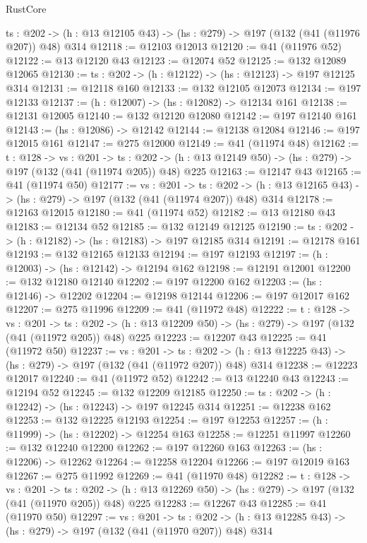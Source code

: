 \begin{lexlean}{RustCore}
\begin{coremodule}
  {ts : @202} -> (h : @13 @12105 @43) -> (hs : @279) -> @197 (@132 (@41 (@11976 @207)) @48) @314
@12118 := @12103 @12013
@12120 := @41 (@11976 @52)
@12122 := @13 @12120 @43
@12123 := @12074 @52
@12125 := @132 @12089 @12065
@12130 := {ts : @202} -> (h : @12122) -> (hs : @12123) -> @197 @12125 @314
@12131 := @12118 @160
@12133 := @132 @12105 @12073
@12134 := @197 @12133
@12137 := (h : @12007) -> (hs : @12082) -> @12134 @161
@12138 := @12131 @12005
@12140 := @132 @12120 @12080
@12142 := @197 @12140 @161
@12143 := (hs : @12086) -> @12142
@12144 := @12138 @12084
@12146 := @197 @12015 @161
@12147 := @275 @12000
@12149 := @41 (@11974 @48)
@12162 := {t : @128} ->
  {vs : @201} ->
  {ts : @202} -> (h : @13 @12149 @50) -> (hs : @279) -> @197 (@132 (@41 (@11974 @205)) @48) @225
@12163 := @12147 @43
@12165 := @41 (@11974 @50)
@12177 := {vs : @201} ->
  {ts : @202} -> (h : @13 @12165 @43) -> (hs : @279) -> @197 (@132 (@41 (@11974 @207)) @48) @314
@12178 := @12163 @12015
@12180 := @41 (@11974 @52)
@12182 := @13 @12180 @43
@12183 := @12134 @52
@12185 := @132 @12149 @12125
@12190 := {ts : @202} -> (h : @12182) -> (hs : @12183) -> @197 @12185 @314
@12191 := @12178 @161
@12193 := @132 @12165 @12133
@12194 := @197 @12193
@12197 := (h : @12003) -> (hs : @12142) -> @12194 @162
@12198 := @12191 @12001
@12200 := @132 @12180 @12140
@12202 := @197 @12200 @162
@12203 := (hs : @12146) -> @12202
@12204 := @12198 @12144
@12206 := @197 @12017 @162
@12207 := @275 @11996
@12209 := @41 (@11972 @48)
@12222 := {t : @128} ->
  {vs : @201} ->
  {ts : @202} -> (h : @13 @12209 @50) -> (hs : @279) -> @197 (@132 (@41 (@11972 @205)) @48) @225
@12223 := @12207 @43
@12225 := @41 (@11972 @50)
@12237 := {vs : @201} ->
  {ts : @202} -> (h : @13 @12225 @43) -> (hs : @279) -> @197 (@132 (@41 (@11972 @207)) @48) @314
@12238 := @12223 @12017
@12240 := @41 (@11972 @52)
@12242 := @13 @12240 @43
@12243 := @12194 @52
@12245 := @132 @12209 @12185
@12250 := {ts : @202} -> (h : @12242) -> (hs : @12243) -> @197 @12245 @314
@12251 := @12238 @162
@12253 := @132 @12225 @12193
@12254 := @197 @12253
@12257 := (h : @11999) -> (hs : @12202) -> @12254 @163
@12258 := @12251 @11997
@12260 := @132 @12240 @12200
@12262 := @197 @12260 @163
@12263 := (hs : @12206) -> @12262
@12264 := @12258 @12204
@12266 := @197 @12019 @163
@12267 := @275 @11992
@12269 := @41 (@11970 @48)
@12282 := {t : @128} ->
  {vs : @201} ->
  {ts : @202} -> (h : @13 @12269 @50) -> (hs : @279) -> @197 (@132 (@41 (@11970 @205)) @48) @225
@12283 := @12267 @43
@12285 := @41 (@11970 @50)
@12297 := {vs : @201} ->
  {ts : @202} -> (h : @13 @12285 @43) -> (hs : @279) -> @197 (@132 (@41 (@11970 @207)) @48) @314

\end{coremodule}
\end{lexlean}
